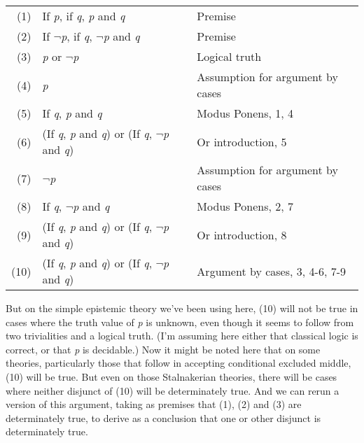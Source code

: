 \bigskip
\begin{tabular}{r l l}
(1)&If \textit{p}, if \textit{q}, \textit{p} and \textit{q}&Premise \\

(2)&If \(\neg\){}\textit{p}, if \textit{q}, \(\neg\){}\textit{p} and \textit{q}&Premise \\

(3)&\textit{p} or \(\neg\){}\textit{p}&Logical truth\\

(4)&\textit{p}&Assumption for argument by cases\\

(5)&If \textit{q}, \textit{p} and \textit{q}&Modus Ponens, 1, 4\\

(6)&(If \textit{q}, \textit{p} and \textit{q}) or (If \textit{q}, \(\neg\){}\textit{p} and \textit{q})&Or introduction, 5\\

(7)&\(\neg\){}\textit{p}&Assumption for argument by cases\\

(8)&If \textit{q}, \(\neg\){}\textit{p} and \textit{q}&Modus Ponens, 2, 7\\

(9)&(If \textit{q}, \textit{p} and \textit{q}) or (If \textit{q}, \(\neg\){}\textit{p} and \textit{q})&Or introduction, 8\\

(10)&(If \textit{q}, \textit{p} and \textit{q}) or (If \textit{q}, \(\neg\){}\textit{p} and \textit{q})&Argument by cases, 3, 4-6, 7-9\\
\end{tabular}
\bigskip

\noindent But on the simple epistemic theory we've been using here, (10) will not be true in cases where the truth value of \textit{p} is unknown, even though it seems to follow from two trivialities and a logical truth. (I'm assuming here either that classical logic is correct, or that \textit{p} is decidable.) Now it might be noted here that on some theories, particularly those that follow \citet{Stalnaker1981} in accepting conditional excluded middle, (10) will be true. But even on those Stalnakerian theories, there will be cases where neither disjunct of (10) will be determinately true. And we can rerun a version of this argument, taking as premises that (1), (2) and (3) are determinately true, to derive as a conclusion that one or other disjunct is determinately true.

